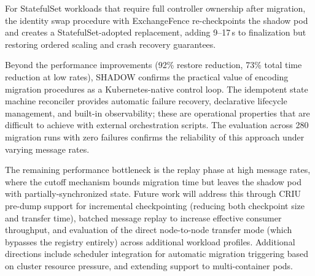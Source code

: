 \documentclass[conference]{IEEEtran}
\begin{document}
For StatefulSet workloads that require full controller ownership after migration,
the identity swap procedure with ExchangeFence re-checkpoints the shadow pod and
creates a StatefulSet-adopted replacement, adding 9--17\,s to finalization but
restoring ordered scaling and crash recovery guarantees.

Beyond the performance improvements (92\% restore reduction, 73\% total time
reduction at low rates), SHADOW confirms the practical value of encoding
migration procedures as a Kubernetes-native control loop. The idempotent state
machine reconciler provides automatic failure recovery, declarative lifecycle
management, and built-in observability; these are operational properties that are
difficult to achieve with external orchestration scripts. The evaluation across
280 migration runs with zero failures confirms the reliability of this approach
under varying message rates.

The remaining performance bottleneck is the replay phase at high message rates,
where the cutoff mechanism bounds migration time but leaves the shadow pod with
partially-synchronized state. Future work will address this through CRIU
pre-dump support for incremental checkpointing (reducing both checkpoint size
and transfer time), batched message replay to increase effective consumer
throughput, and evaluation of the direct node-to-node transfer
mode (which bypasses the registry entirely) across additional workload profiles. Additional directions include
scheduler integration for automatic migration triggering based on cluster
resource pressure, and extending support to multi-container pods.



\balance


\end{document}
